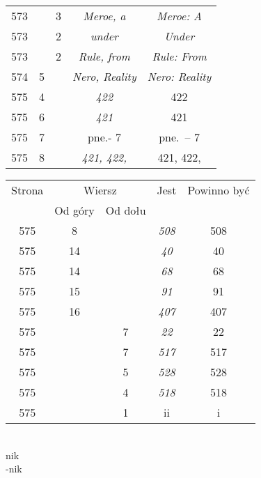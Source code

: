 \documentclass[a4paper,11pt]{article}
\begin{document}
\begin{center}
\begin{tabular}{|c|c|c|c|c|}
    573 & & \hphantom{0}3 & \textit{Meroe, a} & \textit{Meroe: A} \\
    573 & & \hphantom{0}2 & \textit{under} & \textit{Under} \\
    573 & & \hphantom{0}2 & \textit{Rule, from} & \textit{Rule: From} \\
    574 & \hphantom{0}5 & & \textit{Nero, Reality}
    & \textit{Nero: Reality} \\
    575 & \hphantom{0}4 & & \textit{422} & 422 \\
    575 & \hphantom{0}6 & & \textit{421} & 421 \\
    575 & \hphantom{0}7 & & pne.- 7 & pne.~-- 7 \\
    575 & \hphantom{0}8 & & \textit{421, 422,} & 421, 422, \\
    \hline
  \end{tabular}





  \newpage

  \begin{tabular}{|c|c|c|c|c|}
    \hline
    Strona & \multicolumn{2}{c|}{Wiersz} & Jest
    & Powinno być \\ \cline{2-3}
    & Od góry & Od dołu & & \\
    \hline
    575 & \hphantom{0}8 & & \textit{508} & 508 \\
    575 & 14 & & \textit{40} & 40 \\
    575 & 14 & & \textit{68} & 68 \\
    575 & 15 & & \textit{91} & 91 \\
    575 & 16 & & \textit{407} & 407 \\
    575 & & \hphantom{0}7 & \textit{22} & 22 \\
    575 & & \hphantom{0}7 & \textit{517} & 517 \\
    575 & & \hphantom{0}5 & \textit{528} & 528 \\
    575 & & \hphantom{0}4 & \textit{518} & 518 \\
    575 & & \hphantom{0}1 & ii & i \\
    \hline
  \end{tabular}

\end{center}

\VerSpaceSix


\noindent
{} \\
\Jest \hspace{5pt} nik \\
\Powin -nik \\
\end{document}
